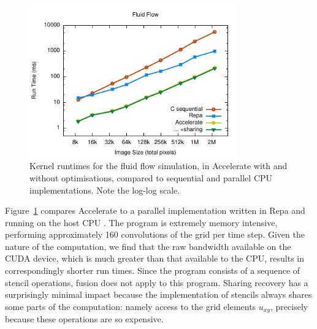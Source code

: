 \begin{figure}
    \begin{center}
        \includegraphics[width=0.8\textwidth]{images/results/fluid/fluid}
    \end{center}
    \caption[Fluid flow simulation kernel benchmarks]{Kernel runtimes for the
        fluid flow simulation, in Accelerate with and without optimisations,
        compared to sequential and parallel CPU implementations.
        Note the log-log scale.}
    \label{fig:fluid}
\end{figure}

Figure~\ref{fig:fluid} compares Accelerate to a parallel implementation written
in Repa and running on the host CPU \cite{Lippmeier:2012gx}. The program is
extremely memory intensive, performing approximately 160 convolutions of the
grid per time step. Given the nature of the computation, we find that the raw
bandwidth available on the CUDA device, which is much greater than that
available to the CPU, results in correspondingly shorter run times. Since the
program consists of a sequence of stencil operations, fusion does not apply to
this program. Sharing recovery has a surprisingly minimal impact because the
implementation of stencils always shares some parts of the computation: namely
access to the grid elements $u_{xy}$, precisely because these operations are so
expensive.


%



